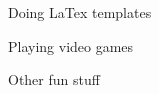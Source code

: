 \documentclass[11pt]{spidercv}
\begin{document}
\begin{MainPart}
    \vspace*{0.5cm}
    \begin{DoubleColumns}
        \begin{ItemList}{\ColorHighlight}
            \item [] Doing LaTex templates
            \item [] Playing video games
        \end{ItemList}
        \nextcolumn
        \begin{ItemList}{\ColorHighlight}
            \item [] Other fun stuff
        \end{ItemList}
    \end{DoubleColumns}

    \end{MainPart}

    
\end{document}
